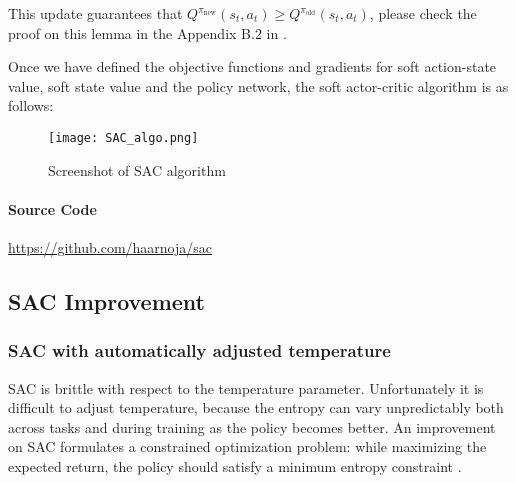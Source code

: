 \documentclass[lang=en,mode=normal,device=normal,color=blue,12pt]{elegantnote}
\DeclareMathOperator*{\1}{\mathbbm{1}}
\begin{document}
This update guarantees that $Q^{\pi_\text{new}}(s_t, a_t) \geq Q^{\pi_\text{old}}(s_t, a_t)$, please check the proof on this lemma in the Appendix B.2 in \cite{haarnoja2018soft}.

Once we have defined the objective functions and gradients for soft action-state value, soft state value and the policy network, the soft actor-critic algorithm is as follows:
\begin{figure}[!ht]
  \centering
  \texttt{[image: SAC\_algo.png]}
  \caption{Screenshot of SAC algorithm}
  \label{fig:SAC_algo}
\end{figure}

\paragraph{Source Code}
\url{https://github.com/haarnoja/sac}

\subsection{SAC Improvement}

\subsubsection{SAC with automatically adjusted temperature}

SAC is brittle with respect to the temperature parameter.
Unfortunately it is difficult to adjust temperature, because the entropy can vary unpredictably both across tasks and during training as the policy becomes better.
An improvement on SAC formulates a constrained optimization problem: while maximizing the expected return, the policy should satisfy a minimum entropy constraint \cite{haarnoja2019soft}.
\end{document}
